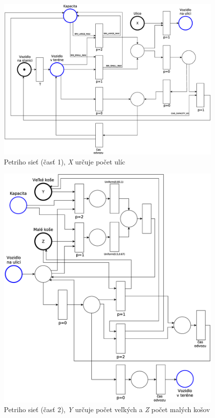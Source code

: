 \documentclass[11pt,a4paper]{article}
\begin{document}
\begin{figure}[h]
    \center
    \includegraphics[scale=0.35]{../pn/pn-part1.eps}
    \caption{Petriho sieť (časť 1), \textit{X} určuje počet ulíc}
    \label{PN-P1}
\end{figure}

\begin{figure}[H]
    \center
    \includegraphics[scale=0.4]{../pn/pn-part2.eps}
    \caption{Petriho sieť (časť 2), \textit{Y} určuje počet veľkých a \textit{Z} počet malých košov}
    \label{PN-P2}
\end{figure}

\newpage %

\makeatletter
\makeatother

\begin{flushleft}
    
\end{flushleft}
\end{document}

